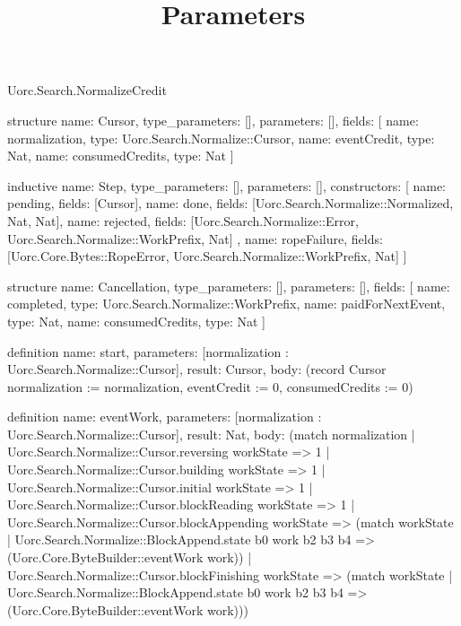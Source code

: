 \begin{lexlean}{Uorc.Search.NormalizeCredit}
\title{Parameters}
\begin{semanticmodule}
structure{
  name: Cursor,
  type_parameters: [],
  parameters: [],
  fields: [
    {name: normalization, type: Uorc.Search.Normalize::Cursor},
    {name: eventCredit, type: Nat},
    {name: consumedCredits, type: Nat}
  ]
}

inductive{
  name: Step,
  type_parameters: [],
  parameters: [],
  constructors: [
    {name: pending, fields: [Cursor]},
    {name: done, fields: [Uorc.Search.Normalize::Normalized, Nat, Nat]},
    {
      name: rejected,
      fields: [Uorc.Search.Normalize::Error, Uorc.Search.Normalize::WorkPrefix, Nat]
    },
    {
      name: ropeFailure,
      fields: [Uorc.Core.Bytes::RopeError, Uorc.Search.Normalize::WorkPrefix, Nat]
    }
  ]
}

structure{
  name: Cancellation,
  type_parameters: [],
  parameters: [],
  fields: [
    {name: completed, type: Uorc.Search.Normalize::WorkPrefix},
    {name: paidForNextEvent, type: Nat},
    {name: consumedCredits, type: Nat}
  ]
}

definition{
  name: start,
  parameters: [normalization : Uorc.Search.Normalize::Cursor],
  result: Cursor,
  body: (record Cursor {normalization := normalization, eventCredit := 0, consumedCredits := 0})
}

definition{
  name: eventWork,
  parameters: [normalization : Uorc.Search.Normalize::Cursor],
  result: Nat,
  body: (match normalization
    | Uorc.Search.Normalize::Cursor.reversing workState => 1
    | Uorc.Search.Normalize::Cursor.building workState => 1
    | Uorc.Search.Normalize::Cursor.initial workState => 1
    | Uorc.Search.Normalize::Cursor.blockReading workState => 1
    | Uorc.Search.Normalize::Cursor.blockAppending workState => (match workState
      | Uorc.Search.Normalize::BlockAppend.state b0 work b2 b3 b4 => (Uorc.Core.ByteBuilder::eventWork work))
    | Uorc.Search.Normalize::Cursor.blockFinishing workState => (match workState
      | Uorc.Search.Normalize::BlockAppend.state b0 work b2 b3 b4 => (Uorc.Core.ByteBuilder::eventWork work)))
}


\end{semanticmodule}
\end{lexlean}
